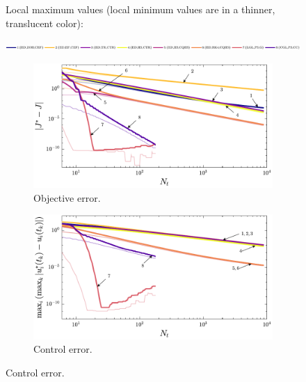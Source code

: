 \begin{figure}%
\centering

{\footnotesize Local maximum values (local minimum values are in a thinner, translucent color):}

\includegraphics[width=\textwidth]{../ch5/figures/ex1_sens_legend}%

\vspace{1mm}

\begin{subfigure}{0.5\textwidth}
\centering
\includegraphics[width=\textwidth]{../ch5/figures/ex4_sens_objective}%
\caption{Objective error.}
\label{fig:ch5:ex4sens:objective}
\end{subfigure}%
\begin{subfigure}{0.5\textwidth}
\centering
\includegraphics[width=\textwidth]{../ch5/figures/ex4_sens_control}%
\caption{Control error.}
\label{fig:ch5:ex4sens:control}
\end{subfigure}%


\end{figure}
